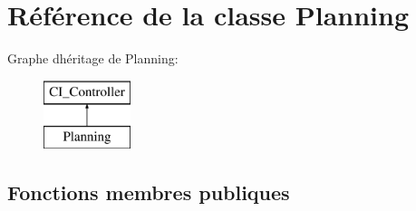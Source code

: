 \hypertarget{class_planning}{}\section{Référence de la classe Planning}
\label{class_planning}
Graphe d\textquotesingle{}héritage de Planning\+:\begin{figure}[H]
\begin{center}
\leavevmode
\includegraphics[height=2.000000cm]{class_planning}
\end{center}
\end{figure}
\subsection*{Fonctions membres publiques}
